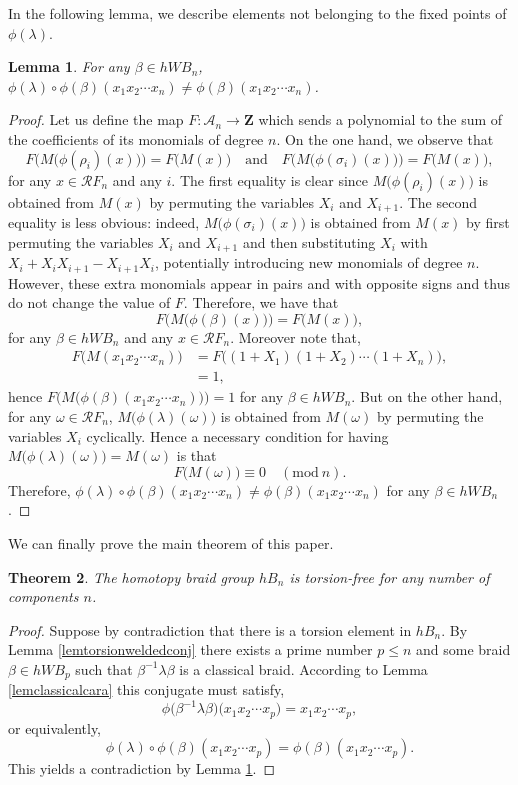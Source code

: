 \documentclass[11pt, a4paper, twoside,reqno]{amsart}
\theoremstyle{plain}
\newtheorem{thm}{Theorem}[section]
\newtheorem{lem}[thm]{Lemma}
\theoremstyle{definition}
\theoremstyle{remark}
\begin{document}
In the following lemma, we describe elements not belonging to the fixed points of $\phi(\lambda)$.\begin{lem}\label{lemnofixptswelded}
For any $\beta\in hWB_n$, $\phi(\lambda)\circ\phi(\beta)(x_1x_2\cdots x_n)\neq\phi(\beta)(x_1x_2\cdots x_n)$.
\end{lem}
\begin{proof}
Let us define the map $F:\mathcal{A}_n\to\mathbf{Z}$ which sends a polynomial to the sum of the coefficients of its monomials of degree $n$. On the one hand, we observe that 
\[F\Big(M\big(\phi(\rho_i)(x)\big)\Big)=F\big(M(x)\big) \quad \text{and}\quad F\Big(M\big(\phi(\sigma_i)(x)\big)\Big)=F\big(M(x)\big),\] for any $x\in\mathcal RF_n$ and any $i$. The first equality is clear since $M\big(\phi(\rho_i)(x)\big)$ is obtained from $M(x)$ by permuting the variables $X_i$ and $X_{i+1}$. The second equality is less obvious: indeed, $M\big(\phi(\sigma_i)(x)\big)$ is obtained from $M(x)$ by first permuting the variables $X_i$ and $X_{i+1}$ and then substituting $X_i$ with $X_i + X_iX_{i+1} - X_{i+1}X_i$, potentially introducing new monomials of degree $n$. However, these extra monomials appear in pairs and with opposite signs and thus do not change the value of $F$. Therefore, we have that 
$$F\big(M\big(\phi(\beta)(x)\big)\big)=F\big(M(x)\big),$$
for any $\beta\in hWB_n$ and any $x\in\mathcal RF_n$. Moreover note that,
\begin{align*}
    F\big(M(x_1x_2\cdots x_n)\big)&=F\big((1+X_1)(1+X_2)\cdots(1+X_n)\big),\\
    &=1,
\end{align*}
hence $F\big(M\big(\phi(\beta)(x_1x_2\cdots x_n)\big)\big)=1$ for any $\beta\in hWB_n$.
But on the other hand, for any $\omega\in\mathcal RF_n$, $M\big(\phi(\lambda)(\omega)\big)$ is obtained from $M(\omega)$ by permuting the variables $X_i$ cyclically. Hence a necessary condition for having $M\big(\phi(\lambda)(\omega)\big)=M(\omega)$ is that $$F\big(M(\omega)\big)\equiv0\quad(\mathrm{mod}\ n).$$
Therefore, $\phi(\lambda)\circ\phi(\beta)(x_1x_2\cdots x_n)\neq\phi(\beta)(x_1x_2\cdots x_n)$ for any $\beta\in hWB_n$.
\end{proof}

We can finally prove the main theorem of this paper.
\begin{thm}\label{thmtorsionfree}
The homotopy braid group $hB_n$ is torsion-free for any number of components $n$.
\end{thm}
\begin{proof}
Suppose by contradiction that there is a torsion element in $hB_n$. By Lemma \ref{lemtorsionweldedconj} there exists a prime number $p\leq n$ and some braid $\beta\in hWB_p$ such that $\beta^{-1}\lambda\beta$ is a classical braid. According to Lemma \ref{lemclassicalcara} this conjugate must satisfy,
$$\phi\big(\beta^{-1}\lambda\beta\big)\big(x_1x_2\cdots x_p)=x_1x_2\cdots x_p,$$
or equivalently,
$$\phi(\lambda)\circ \phi(\beta)(x_1x_2\cdots x_p)= \phi(\beta)(x_1x_2\cdots x_p).$$
This yields a contradiction by Lemma \ref{lemnofixptswelded}.
\end{proof}
\end{document}
